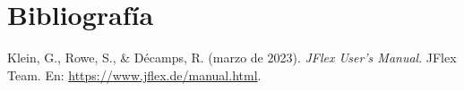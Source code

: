 \documentclass[a4paper,12pt]{article}
\begin{document}
\newpage
\section*{Bibliografía}
\begin{thebibliography}{9}

Klein, G., Rowe, S., \& Décamps, R. (marzo de 2023).
\emph{JFlex User’s Manual}.
JFlex Team.
En: \url{https://www.jflex.de/manual.html}.

\end{thebibliography}
\end{document}
